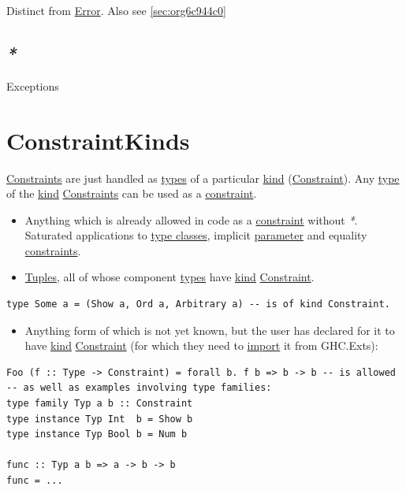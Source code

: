 \documentclass[a4paper,14pt,oneside]{book}
\begin{document}
Distinct from \hyperref[org004b900]{Error}. Also see \ref{sec:org6c944c0}

\section{\emph{*}}
\label{sec:org7450478}

\label{orgf94b1ed}Exceptions

\chapter{\label{orgcbad988}ConstraintKinds}
\label{sec:org7cc40cc}
\hyperref[org3b9e7d2]{Constraints} are just handled as \hyperref[orgd1c0201]{types} of a particular \hyperref[org204493e]{kind} (\hyperref[org6e394a5]{Constraint}).
Any \hyperref[org84bd6a1]{type} of the \hyperref[org204493e]{kind} \hyperref[org3b9e7d2]{Constraints} can be used as a \hyperref[org6e394a5]{constraint}.
\begin{itemize}
\item Anything which is already allowed in code as a \hyperref[org6e394a5]{constraint} without \emph{*}. Saturated applications to \hyperref[org08ef83e]{type classes}, implicit \hyperref[org8c3ab53]{parameter} and equality \hyperref[org3b9e7d2]{constraints}.
\item \hyperref[orgba912ea]{Tuples}, all of whose component \hyperref[orgd1c0201]{types} have \hyperref[org204493e]{kind} \hyperref[org6e394a5]{Constraint}.
\end{itemize}
\begin{verbatim}
type Some a = (Show a, Ord a, Arbitrary a) -- is of kind Constraint.
\end{verbatim}
\begin{itemize}
\item Anything form of which is not yet known, but the user has declared for it to have \hyperref[org204493e]{kind} \hyperref[org6e394a5]{Constraint} (for which they need to \hyperref[org7c06f25]{import} it from GHC.Exts):
\end{itemize}
\begin{verbatim}
Foo (f :: Type -> Constraint) = forall b. f b => b -> b -- is allowed
-- as well as examples involving type families:
type family Typ a b :: Constraint
type instance Typ Int  b = Show b
type instance Typ Bool b = Num b

func :: Typ a b => a -> b -> b
func = ...
\end{verbatim}
\end{document}
